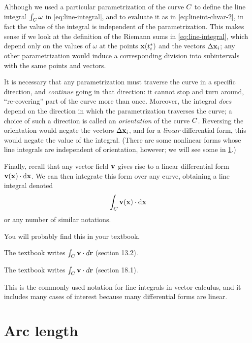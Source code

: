 \documentclass[12pt]{amsart}
\begin{document}
\begin{rmk}\label{rmk:lineint-orientation}
  Although we used a particular parametrization of the curve $C$ to define the line integral $\int_{C} \omega$ in \cref{eq:line-integral}, and to evaluate it as in \cref{eq:lineint-chvar-2}, in fact the value of the integral is independent of the parametrization.
  This makes sense if we look at the definition of the Riemann sums in \cref{eq:line-integral}, which depend only on the values of $\omega$ at the points $\mathbf{x}({t}_{i}^*)$ and the vectors $\Delta \mathbf{x}_i$; any other parametrization would induce a corresponding division into subintervals with the same points and vectors.

  It is necessary that any parametrization must traverse the curve in a specific direction, and \emph{continue} going in that direction: it cannot stop and turn around, ``re-covering'' part of the curve more than once.
  Moreover, the integral \emph{does} depend on the direction in which the parametrization traverses the curve; a choice of such a direction is called an \emph{orientation} of the curve $C$.
  Reversing the orientation would negate the vectors $\Delta \mathbf{x}_i$, and for a \emph{linear} differential form, this would negate the value of the integral.
  (There are some nonlinear forms whose line integrals are independent of orientation, however; we will see some in \cref{sec:arc-length}.)
\end{rmk}

Finally, recall that any vector field $\mathbf{v}$ gives rise to a linear differential form $\mathbf{v}(\mathbf{x}) \cdot {\ensuremath{\mathrm{d} \mathbf{x}}}$.
We can then integrate this form over any curve, obtaining a line integral denoted
\[ \int_{C} \mathbf{v}(\mathbf{x}) \cdot {\ensuremath{\mathrm{d} \mathbf{x}}} \]
or any number of similar notations.
\begin{notextbook}You will probably find this in your textbook.\end{notextbook}%
\begin{stewart}The textbook writes $\int_{C} \mathbf{v} \cdot d\mathbf{r}$ (section 13.2).\end{stewart}
\begin{hugheshallett}The textbook writes $\int_{C} \mathbf{v} \cdot d\mathbf{r}$ (section 18.1).\end{hugheshallett}
This is the commonly used notation for line integrals in vector calculus, and it includes many cases of interest because many differential forms are linear.


\section{Arc length}
\label{sec:arc-length}
\end{document}

